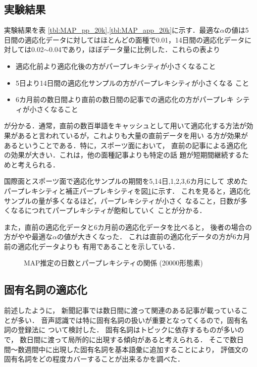 \subsection{実験結果}実験結果を表
\ref{tbl:MAP_pp_20k},\ref{tbl:MAP_app_20k}に示す．最適な$\alpha$の値は5
日間の適応化データに対してはほとんどの面種で0.01，14日間の適応化データに
対しては0.02$\sim$0.04であり，ほぼデータ量に比例した．これらの表より
 \begin{itemize}
  \item 適応化前より適応化後の方がパープレキシティが小さくなること
  \item 5日より14日間の適応化サンプルの方がパープレキシティが小さくなる
	こと
  \item 6カ月前の数日間より直前の数日間の記事での適応化の方がパープレキ
	\mbox{シティが小さくな}ること
 \end{itemize}
が分かる．通常，直前の数百単語をキャッシュとして用いて適応化する方法が効
果があると言われているが\cite{test20}，これよりも大量の直前データを用い
る方が効果があるということである\cite{test8}．特に，スポーツ面において，
直前の記事による適応化の効果が大きい．これは，他の面種記事よりも特定の話
題が短期間継続するためと考えられる．

 国際面とスポーツ面で適応化サンプルの期間を5,14日,1,2,3,6カ月にして
 求めたパープレキシティと補正パープレキシティを図\ref{fig:pp2}に示す．
 \mbox{これを見ると，適応化サンプルの量が多くなるほ}ど，パープレキシティが小さく
 なること，日数が多くなるにつれてパープレキシティが飽和していく
 ことが分かる．

また，直前の適応化データと6カ月前の適応化データを比べると，
後者の場合の方がやや最適な$\alpha$の値が大きくなった．
これは直前の適応化データの方が6カ月前の適応化データよりも
有用であることを示している．

{\small

}

\begin{figure}[htbp]
 \centering
 \caption{MAP推定の日数とパープレキシティの関係 (20000形態素)}
 \label{fig:pp2}
\end{figure}


\subsection{固有名詞の適応化}

前述したように，
新聞記事では数日間に渡って関連のある記事が載っていることが多い．
音声認識では特に固有名詞の扱いが重要となってくるので，固有名詞の登録法に
ついて検討した．
固有名詞はトピックに依存するものが多いので，
数日間に渡って局所的に出現する傾向があると考えられる．
そこで数日間〜数週間中に出現した固有名詞を基本語彙に追加することにより，
評価文の固有名詞をどの程度カバーすることが出来るかを調べた．

